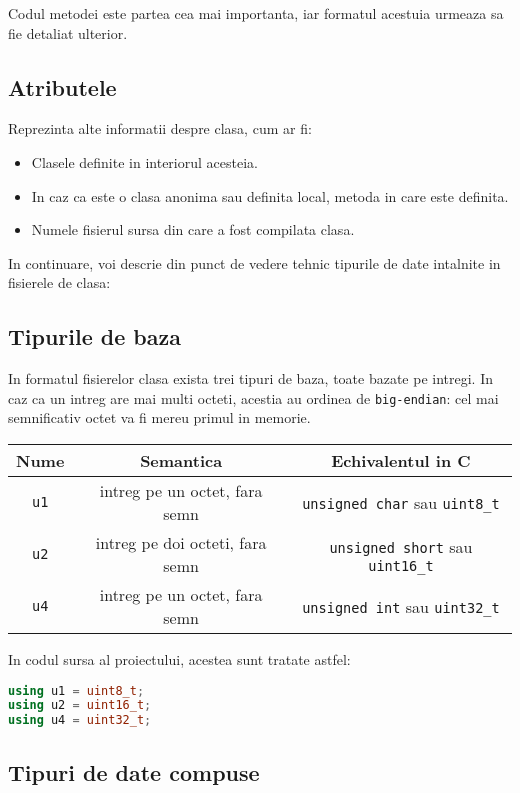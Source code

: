 Codul metodei este partea cea mai importanta, iar formatul acestuia
urmeaza sa fie detaliat ulterior.

\subsection{Atributele}

Reprezinta alte informatii despre clasa, cum ar fi:
\begin{itemize}
    \item Clasele definite in interiorul acesteia.
    \item In caz ca este o clasa anonima sau definita local, metoda in care este definita.
    \item Numele fisierul sursa din care a fost compilata clasa.
\end{itemize}

In continuare, voi descrie din punct de vedere tehnic tipurile de date
intalnite in fisierele de clasa:

\subsection{Tipurile de baza}

In formatul fisierelor clasa exista trei tipuri de baza, toate bazate pe
intregi. In caz ca un intreg are mai multi octeti, acestia au ordinea de
\texttt{big-endian}: cel mai semnificativ octet va fi mereu primul in
memorie.

\begin{longtable}[]{@{}ccc@{}}
\toprule
Nume & Semantica & Echivalentul in C\tabularnewline
\midrule
\endhead
\texttt{u1} & intreg pe un octet, fara semn & \texttt{unsigned\ char}
sau \texttt{uint8\_t}\tabularnewline
\texttt{u2} & intreg pe doi octeti, fara semn & \texttt{unsigned\ short}
sau \texttt{uint16\_t}\tabularnewline
\texttt{u4} & intreg pe un octet, fara semn & \texttt{unsigned\ int} sau
\texttt{uint32\_t}\tabularnewline
\bottomrule
\end{longtable}

In codul sursa al proiectului, acestea sunt tratate astfel:

\begin{lstlisting}[language=C++]
using u1 = uint8_t;
using u2 = uint16_t;
using u4 = uint32_t;
\end{lstlisting}

\subsection{Tipuri de date compuse}

